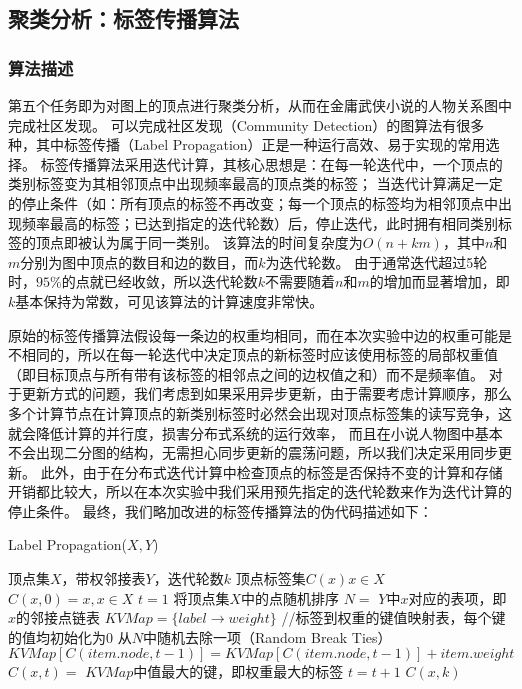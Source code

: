 \subsection{聚类分析：标签传播算法}

\subsubsection{算法描述}
第五个任务即为对图上的顶点进行聚类分析，从而在金庸武侠小说的人物关系图中完成社区发现。
可以完成社区发现（Community Detection）的图算法有很多种，其中标签传播（Label Propagation）正是一种运行高效、易于实现的常用选择。
标签传播算法采用迭代计算，其核心思想是：在每一轮迭代中，一个顶点的类别标签变为其相邻顶点中出现频率最高的顶点类的标签；
当迭代计算满足一定的停止条件（如：所有顶点的标签不再改变；每一个顶点的标签均为相邻顶点中出现频率最高的标签；已达到指定的迭代轮数）后，停止迭代，此时拥有相同类别标签的顶点即被认为属于同一类别。
该算法的时间复杂度为$O(n+km)$，其中$n$和$m$分别为图中顶点的数目和边的数目，而$k$为迭代轮数。
由于通常迭代超过5轮时，$95\%$的点就已经收敛，所以迭代轮数$k$不需要随着$n$和$m$的增加而显著增加，即$k$基本保持为常数，可见该算法的计算速度非常快。
\par
原始的标签传播算法假设每一条边的权重均相同，而在本次实验中边的权重可能是不相同的，所以在每一轮迭代中决定顶点的新标签时应该使用标签的局部权重值（即目标顶点与所有带有该标签的相邻点之间的边权值之和）而不是频率值。
对于更新方式的问题，我们考虑到如果采用异步更新，由于需要考虑计算顺序，那么多个计算节点在计算顶点的新类别标签时必然会出现对顶点标签集的读写竞争，这就会降低计算的并行度，损害分布式系统的运行效率，
而且在小说人物图中基本不会出现二分图的结构，无需担心同步更新的震荡问题，所以我们决定采用同步更新。
此外，由于在分布式迭代计算中检查顶点的标签是否保持不变的计算和存储开销都比较大，所以在本次实验中我们采用预先指定的迭代轮数来作为迭代计算的停止条件。
最终，我们略加改进的标签传播算法的伪代码描述如下：
\begin{algorithm}[H]
    \caption{Label Propagation($X,Y$)}
    \begin{algorithmic}[1]
        \REQUIRE 顶点集$X$，带权邻接表$Y$，迭代轮数$k$
        \ENSURE 顶点标签集$C(x) x \in X$
        \STATE $C(x, 0) = x, x \in X$
        \STATE $t = 1$
        \STATE 将顶点集$X$中的点随机排序
        \STATE $N =$ $Y$中$x$对应的表项，即$x$的邻接点链表
        \STATE $KVMap = \{label \rightarrow weight\}$ //标签到权重的键值映射表，每个键的值均初始化为0
        \STATE 从$N$中随机去除一项（Random Break Ties）
        \STATE $KVMap[C(item.node, t-1)] = KVMap[C(item.node, t-1)] + item.weight$
        \ENDFOR
        \STATE $C(x, t) =$ $KVMap$中值最大的键，即权重最大的标签
        \ENDFOR
        \STATE $t = t + 1$
        \ENDFOR
        \RETURN $C(x, k)$
    \end{algorithmic}
\end{algorithm}

